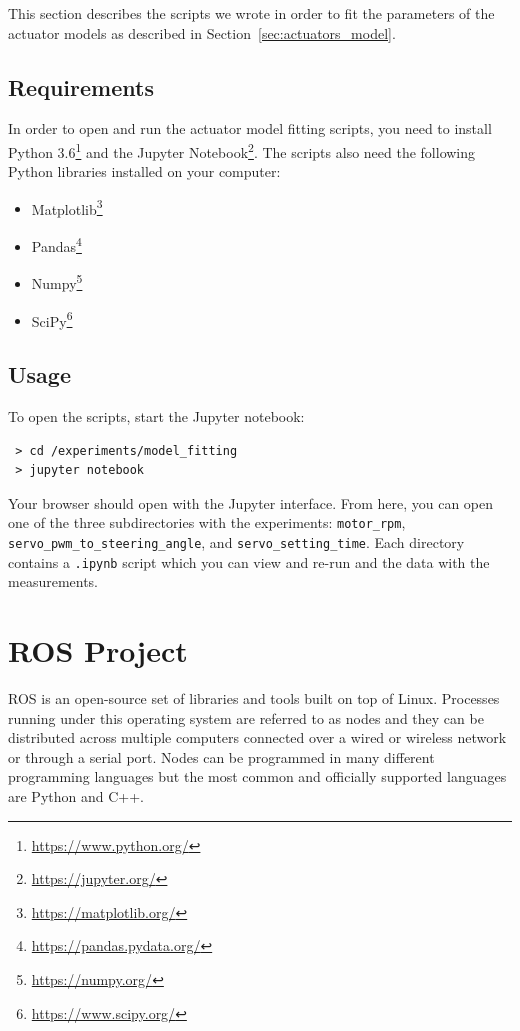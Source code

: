 This section describes the scripts we wrote in order to fit the parameters of the actuator models as described in Section~\ref{sec:actuators_model}.

\subsection{Requirements}

In order to open and run the actuator model fitting scripts, you need to install Python 3.6\footnote{\url{https://www.python.org/}} and the Jupyter Notebook\footnote{\url{https://jupyter.org/}}. The scripts also need the following Python libraries installed on your computer:

\begin{itemize}
	\item Matplotlib\footnote{\url{https://matplotlib.org/}}
	\item Pandas\footnote{\url{https://pandas.pydata.org/}}
	\item Numpy\footnote{\url{https://numpy.org/}}
	\item SciPy\footnote{\url{https://www.scipy.org/}}
\end{itemize}

\subsection{Usage}

To open the scripts, start the Jupyter notebook:

\begin{verbatim}
 > cd /experiments/model_fitting
 > jupyter notebook
\end{verbatim}

Your browser should open with the Jupyter interface. From here, you can open one of the three subdirectories with the experiments: \texttt{motor\_rpm}, \texttt{servo\_pwm\-\_to\_\-steering\_angle}, and \texttt{servo\_setting\_time}. Each directory contains a \texttt{.ipynb} script which you can view and re-run and the data with the measurements.

\section{ROS Project}

\gls{ROS} is an open-source set of libraries and tools built on top of Linux. Processes running under this operating system are referred to as nodes and they can be distributed across multiple computers connected over a wired or wireless network or through a serial port. Nodes can be programmed in many different programming languages but the most common and officially supported languages are Python and C++.

